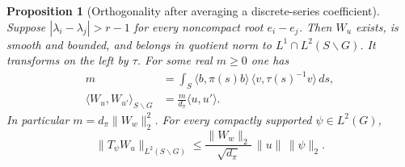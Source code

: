 \documentclass[a4paper,11pt]{article}
\newtheorem{proposition}{Proposition}[section]
\theoremstyle{definition}
\theoremstyle{remark}
\numberwithin{equation}{section}
\begin{document}
\begin{proposition}[Orthogonality after averaging a discrete-series coefficient]
\leavevmode\label{prop:averagedschur684}
Suppose \(|\lambda_i-\lambda_j|>r-1\) for every noncompact
root \(e_i-e_j\). Then \(W_u\) exists, is smooth and bounded,
and belongs in quotient norm to \(L^1\cap L^2(S\backslash G)\).
It transforms on the left by \(\tau\). For some real \(m\ge0\)
one has
\[
 \begin{split}
 m&=\int_S\langle b,\pi(s)b\rangle\,
                  \langle v,\tau(s)^{-1}v\rangle\,ds,\\
 \langle W_u,W_{u'}\rangle_{S\backslash G}
         &=\frac{m}{d_\pi}\langle u,u'\rangle.
 \end{split}
\]
In particular \(m=d_\pi\|W_w\|_2^2\). For every compactly
supported \(\psi\in L^2(G)\),
\[
    \|T_\psi W_u\|_{L^2(S\backslash G)}
          \le \frac{\|W_w\|_2}{\sqrt{d_\pi}}\,
                        \|u\|\,\|\psi\|_2 .
\]
\end{proposition}
\end{document}
